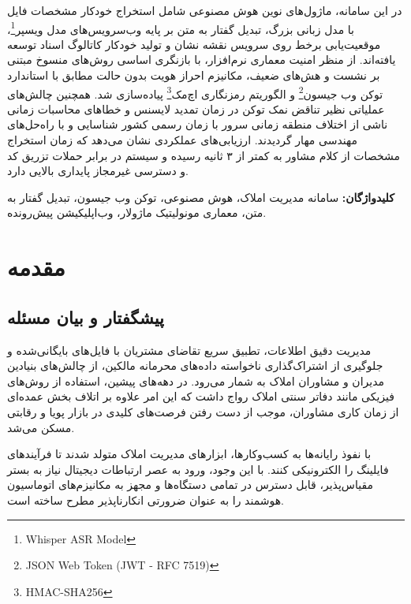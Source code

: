 \documentclass[11pt, a4paper]{report}
\newcommand{\enfootnote}[1]{\footnote{\foreignlanguage{english}{#1}}}
\begin{document}
در این سامانه، ماژول‌های نوین هوش مصنوعی شامل استخراج خودکار مشخصات فایل با مدل زبانی بزرگ، تبدیل گفتار به متن بر پایه وب‌سرویس‌های مدل ویسپر\enfootnote{Whisper ASR Model}، موقعیت‌یابی برخط روی سرویس نقشه نشان و تولید خودکار کاتالوگ اسناد توسعه یافته‌اند. از منظر امنیت معماری نرم‌افزار، با بازنگری اساسی روش‌های منسوخ مبتنی بر نشست و هش‌های ضعیف، مکانیزم احراز هویت بدون حالت مطابق با استاندارد توکن وب جیسون\enfootnote{JSON Web Token (JWT - RFC 7519)} و الگوریتم رمزنگاری اچ‌مک\enfootnote{HMAC-SHA256} پیاده‌سازی شد. همچنین چالش‌های عملیاتی نظیر تناقض نمک توکن در زمان تمدید لایسنس و خطاهای محاسبات زمانی ناشی از اختلاف منطقه زمانی سرور با زمان رسمی کشور شناسایی و با راه‌حل‌های مهندسی مهار گردیدند. ارزیابی‌های عملکردی نشان می‌دهد که زمان استخراج مشخصات از کلام مشاور به کمتر از ۳ ثانیه رسیده و سیستم در برابر حملات تزریق کد و دسترسی غیرمجاز پایداری بالایی دارد.

\vspace{0.8cm}
\noindent \textbf{کلیدواژگان:} سامانه مدیریت املاک، هوش مصنوعی، توکن وب جیسون، تبدیل گفتار به متن، معماری مونولیتیک ماژولار، وب‌اپلیکیشن پیش‌رونده.

\clearpage
\tableofcontents
\clearpage
\listoffigures
\clearpage
\listoftables
\clearpage
\listofalgorithms
\clearpage

\chapter{مقدمه}

\section{پیشگفتار و بیان مسئله}
مدیریت دقیق اطلاعات، تطبیق سریع تقاضای مشتریان با فایل‌های بایگانی‌شده و جلوگیری از اشتراک‌گذاری ناخواسته داده‌های محرمانه مالکین، از چالش‌های بنیادین مدیران و مشاوران املاک به شمار می‌رود. در دهه‌های پیشین، استفاده از روش‌های فیزیکی مانند دفاتر سنتی املاک رواج داشت که این امر علاوه بر اتلاف بخش عمده‌ای از زمان کاری مشاوران، موجب از دست رفتن فرصت‌های کلیدی در بازار پویا و رقابتی مسکن می‌شد.

با نفوذ رایانه‌ها به کسب‌وکارها، ابزارهای مدیریت املاک متولد شدند تا فرآیندهای فایلینگ را الکترونیکی کنند. با این وجود، ورود به عصر ارتباطات دیجیتال نیاز به بستر مقیاس‌پذیر، قابل دسترس در تمامی دستگاه‌ها و مجهز به مکانیزم‌های اتوماسیون هوشمند را به عنوان ضرورتی انکارناپذیر مطرح ساخته است.
\end{document}
